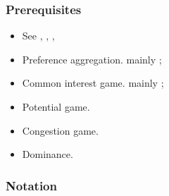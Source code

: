 \documentclass{article}
\begin{document}
\subsubsection{Prerequisites}
\begin{itemize}
 \item See \cite{holzman}, \cite{rosenthal}, \cite{rossi}, \cite{voorneveld}
 \item Preference aggregation. mainly \cite{rossi};
 \item Common interest game. mainly \cite{rossi};
 \item Potential game.
 \item Congestion game.
 \item Dominance.
\end{itemize}

\subsubsection{Notation}
\end{document}
